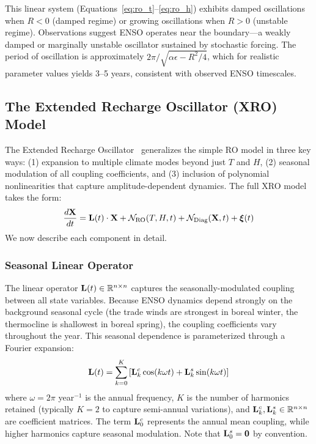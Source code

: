 This linear system (Equations~\ref{eq:ro_t}--\ref{eq:ro_h}) exhibits damped oscillations when $R < 0$ (damped regime) or growing oscillations when $R > 0$ (unstable regime). Observations suggest ENSO operates near the boundary---a weakly damped or marginally unstable oscillator sustained by stochastic forcing. The period of oscillation is approximately $2\pi/\sqrt{\alpha\epsilon - R^2/4}$, which for realistic parameter values yields 3--5 years, consistent with observed ENSO timescales.

\subsection{The Extended Recharge Oscillator (XRO) Model}

The Extended Recharge Oscillator~\cite{zhao2024xro} generalizes the simple RO model in three key ways: (1) expansion to multiple climate modes beyond just $T$ and $H$, (2) seasonal modulation of all coupling coefficients, and (3) inclusion of polynomial nonlinearities that capture amplitude-dependent dynamics. The full XRO model takes the form:
\begin{equation}
    \frac{d\mathbf{X}}{dt} = \mathbf{L}(t) \cdot \mathbf{X} + \mathcal{N}_{\text{RO}}(T, H, t) + \mathcal{N}_{\text{Diag}}(\mathbf{X}, t) + \boldsymbol{\xi}(t)
    \label{eq:xro_full}
\end{equation}
We now describe each component in detail.

\subsubsection{Seasonal Linear Operator}

The linear operator $\mathbf{L}(t) \in \mathbb{R}^{n \times n}$ captures the seasonally-modulated coupling between all state variables. Because ENSO dynamics depend strongly on the background seasonal cycle (the trade winds are strongest in boreal winter, the thermocline is shallowest in boreal spring), the coupling coefficients vary throughout the year. This seasonal dependence is parameterized through a Fourier expansion:
\begin{equation}
    \mathbf{L}(t) = \sum_{k=0}^{K} \left[ \mathbf{L}_k^c \cos(k\omega t) + \mathbf{L}_k^s \sin(k\omega t) \right]
    \label{eq:seasonal_L}
\end{equation}
where $\omega = 2\pi$ year$^{-1}$ is the annual frequency, $K$ is the number of harmonics retained (typically $K=2$ to capture semi-annual variations), and $\mathbf{L}_k^c, \mathbf{L}_k^s \in \mathbb{R}^{n \times n}$ are coefficient matrices. The term $\mathbf{L}_0^c$ represents the annual mean coupling, while higher harmonics capture seasonal modulation. Note that $\mathbf{L}_0^s = \mathbf{0}$ by convention.

